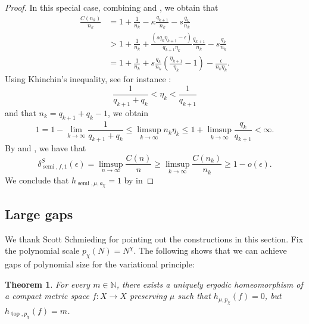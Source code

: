 \documentclass[oneside]{amsart}
\theoremstyle{plain}
\newtheorem{THM}{Theorem}[section]
\theoremstyle{definition}
\newcommand{\<}{\langle}
\renewcommand{\>}{\rangle}
\newcommand{\e}{\epsilon}
\newcommand{\N}{\mathbb{N}}
\newcommand{\topo}{\operatorname{top}}
\renewcommand{\|}{|\!|} %
\newcommand{\semitop}{\operatorname{semi}} %
\begin{document}
\begin{proof}
 In this special case, combining  and , we obtain that
\begin{equation}
\label{eq:longEstimateforGrowth}
\begin{split}
    \frac{C(n_k)}{n_k}&=
    1+\frac{1}{n_k}-
        \kappa\frac{q_{k+1}}{n_k}
        -
        s\frac{q_k}{n_k}
\\
& > 
    1 + \frac{1}{n_k}
    +
        \frac{(sq_k\eta_{k+1}-\e)}{q_{k+1}\eta_k}\frac{q_{k+1}}{n_k}
    -
        s\frac{q_k}{n_k}
\\
& = 1+\frac{1}{n_k}
+s\frac{q_k}{n_k}\left(\frac{\eta_{k+1}}{\eta_k}-1\right) - \frac{\e}{n_k\eta_k}.
\end{split}
\end{equation}
Using Khinchin's  inequality, see for instance \cite[Theorems 9 and 13]{Khinchin}:
\begin{equation*}
    \frac{1}{q_{k+1}+q_{k}}
    <
    \eta_k
    <
    \frac{1}{q_{k+1}}
\end{equation*}
and that $n_k= q_{k+1}+q_{k}-1$,
we obtain
\begin{equation}
\label{eq:limsupSteinhaus}
    1 = 1 - \lim_{k\to \infty}\frac{1}{q_{k+1}+q_{k}}
    \leq 
    \limsup_{k \to \infty} n_k\eta_k 
    \le 
    1 + \limsup_{k \to \infty}\frac{q_{k}}{q_{k+1}} < \infty.
\end{equation}
By  and ,
we have that 
\begin{equation*}
\delta_{\semitop,f,1} ^S(\e) =     \limsup_{n\to \infty} \frac{C(n)}{n} \geq \limsup_{k \to \infty}\frac{C(n_k)}{n_k}\geq 1-o(\e).
\end{equation*}
We conclude that $h_{\semitop,\mu,a_\chi} = 1$ by  in 
\end{proof}

\subsection{Large gaps}

We thank Scott Schmieding for pointing out the constructions in this section. Fix the polynomial scale $p_\chi(N) = N^\chi$. The following shows that we can achieve gaps of polynomial size for the variational principle:

\begin{THM}
\label{thm:big-polynomial}
    For every $m \in \N$, there exists a uniquely ergodic homeomorphism of a compact metric space $f : X \to X$ preserving $\mu$ such that $h_{\mu,p_\chi}(f) = 0$, but $h_{\topo,p_\chi}(f) = m$.
\end{THM}
\end{document}
